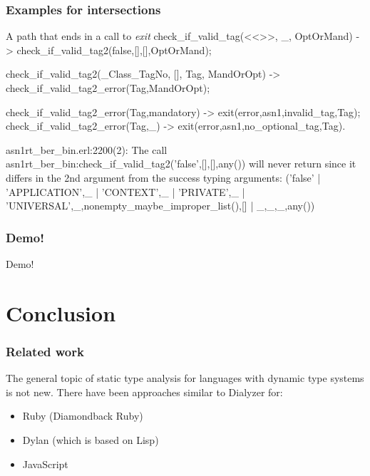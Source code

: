 \documentclass{beamer}
\begin{document}
\begin{frame}[fragile]
  \frametitle{Examples for intersections}
\begin{code}{A path that ends in a call to \emph{exit}}
check_if_valid_tag(<<>>, _, OptOrMand) ->
    check_if_valid_tag2(false,[],[],OptOrMand);

check_if_valid_tag2(_Class_TagNo, [], Tag, MandOrOpt) ->
    check_if_valid_tag2_error(Tag,MandOrOpt);

check_if_valid_tag2_error(Tag,mandatory) ->
    exit({error,{asn1,{invalid_tag,Tag}}});
check_if_valid_tag2_error(Tag,_) ->
    exit({error,{asn1,{no_optional_tag,Tag}}}).

asn1rt_ber_bin.erl:2200(2): The call
 asn1rt_ber_bin:check_if_valid_tag2('false',[],[],any())
 will never return since it differs in the 2nd argument
 from the success typing arguments: ('false' |
 {'APPLICATION',_} | {'CONTEXT',_} | {'PRIVATE',_} |
 {'UNIVERSAL',_},nonempty_maybe_improper_list(),[] |
 {_,_,_},any())
\end{code}
\end{frame}

\begin{frame}
  \frametitle{Demo!}
  \begin{center}
    Demo!
  \end{center}
\end{frame}

\section{Conclusion}

\begin{frame}
  \frametitle{Related work}
  The general topic of static type analysis for languages with dynamic
  type systems is not new. There have been approaches similar to
  Dialyzer for:
  \begin{itemize}
  \item Ruby (Diamondback Ruby)
  \item Dylan (which is based on Lisp)
  \item JavaScript
  \end{itemize}
\end{frame}
\end{document}
